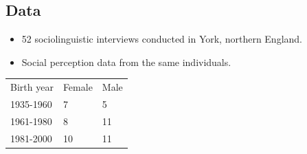 \documentclass[a0,portrait]{a0poster}
\begin{document}
\begin{multicols}{3}




\section*{Data}
\begin{itemize}
\item{52 sociolinguistic interviews conducted in York, northern England.}
\item{Social perception data from the same individuals.}
\end{itemize}
\vspace*{0.5cm}
\begin{table}[H]
\centering
\begin{tabular}{l|l|l}
Birth year&Female & Male \\
1935-1960 &7 &5\\
 1961-1980& 8 & 11\\
1981-2000& 10 &11\\
\end{tabular}
  \end{table}
 \vspace*{-1cm}

\end{multicols}
\end{document}

